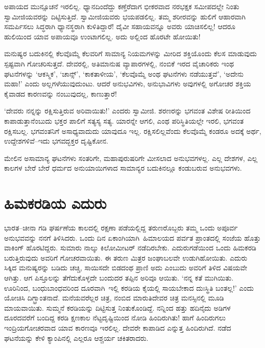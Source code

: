 ಅಪಾಯದ ಮುನ್ಸೂಚನೆ ಇರಲಿಲ್ಲ. ಧ್ಯಾನದಿಂದೆದ್ದು ಕಣ್ತೆರೆದಾಗ ಭೀಕರವಾದ ನರಭಕ್ಷಕ ಸಮೀಪದಲ್ಲೇ ನಿಂತು ಸ್ವಾಮೀಜಿಯವರನ್ನು ದಿಟ್ಟಿಸುತ್ತಿದೆ. ಸ್ವಾಮೀಜಿಯವರು ಭಯಪಡಲಿಲ್ಲ. ತಮ್ಮ ಶರೀರವನ್ನು ಹುಲಿಗೆ ಆಹಾರವಾಗಿ ಸಮರ್ಪಿಸಲು ಸಿದ್ಧರಾಗಿ ಧ್ಯಾನಸ್ಥರಾಗಿ ಕುಳಿತಿದ್ದಾರೆ! ದೈವೀ ಸಹಾಯವನ್ನೂ ಅವರು ಯಾಚಿಸಲಿಲ್ಲ! ಆದರೂ ಹುಲಿಯಿಂದ ಯಾವ ಅಪಾಯವೂ ಉಂಟಾಗಲಿಲ್ಲ. ಅದು ಅಲ್ಲಿಂದ ಹೊರಟೇ ಹೋಯಿತು!

ಮನುಷ್ಯರ ಬದುಕಿನಲ್ಲಿ ಕೆಲವೊಮ್ಮೆ ಕೆಲವರಿಗೆ ಸಾಮಾನ್ಯ ನಿಯಮಗಳನ್ನು ಮೀರಿದ ಶಕ್ತಿ\-ಯೊಂದು ಕೆಲಸ ಮಾಡುವುದು ಸ್ಪಷ್ಟವಾಗಿ ಗೋಚರಿಸುತ್ತದೆ. ದೇವರಲ್ಲಿ, ಅತಿಮಾನುಷ ವ್ಯಾಪಾರಗಳಲ್ಲಿ, ನಂಬಿಕೆ ಇರದ ವೈಚಾರಿಕರು ಇಂಥ ಘಟನೆಗಳನ್ನು ‘ಆಕಸ್ಮಿಕ’, ‘ಚಾನ್ಸ್​’, ‘ಕಾಕತಾಳೀಯ’, ‘ಕೆಲವೊಮ್ಮೆ ಅಂಥ ಘಟನೆಗಳು ನಡೆಯುತ್ತವೆ’, ‘ಅದೇನು ಮಹಾ!’ ಎಂದು ಅಲ್ಲಗಳೆಯುವುದುಂಟು. ಆದರೆ ಅನುಭವಿಗಳು, ಅನುಭಾವಿಗಳು ಅವುಗಳಲ್ಲಿ ಅಗೋಚರ ಶಕ್ತಿಯ ಕೈವಾಡದ ಕಾರಣವನ್ನು ನಂಬುವುದಲ್ಲ, ಕಾಣುತ್ತಾರೆ!

‘ದೇವರು ನನ್ನನ್ನು ರಕ್ಷಿಸುತ್ತಿರುವ ಅರಿವಾಯಿತು!’ ಎಂದರು ಸ್ವಾಮೀಜಿ. ಶರಣರನ್ನು ಭಗವಂತ ವಿಶೇಷ ರೀತಿಯಿಂದ ಕಾಪಾಡುತ್ತಾನೆಂಬುದು ಭಕ್ತರ ಪಾಲಿಗೆ ಸತ್ಯಸ್ಯ ಸತ್ಯ. ಯಾರನ್ನೇ ಆಗಲಿ, ಎಂಥ ಪರಿಸ್ಥಿತಿಯಲ್ಲೇ ಇರಲಿ, ಭಗವಂತ ರಕ್ಷಿಸಬಲ್ಲ. ಭಗವಂತನಿಗೆ ಅಸಾಧ್ಯವಾದುದು ಯಾವುದೂ ಇಲ್ಲ. ರಕ್ಷಿಸಲಿಲ್ಲವೆಂದು ಕೆಲವೊಮ್ಮೆ ಕಂಡರೂ ಅದಕ್ಕೆ ಅರ್ಥ, ಉದ್ದೇಶಗಳಿವೆ–ಇದು ಭಗವದ್ಭಕ್ತರ ದೃಷ್ಟಿಕೋನ.

ಮೇಲಿನ ಅಸಾಮಾನ್ಯ ಘಟನೆಗಳು ಸಂತರಿಗೇ, ಮಹಾಪುರುಷರಿಗೇ ಮೀಸಲಾದ ಅನುಭವಗಳಲ್ಲ. ಎಲ್ಲ ದೇಶಗಳ, ಎಲ್ಲ ಕಾಲಗಳ ಬೇರೆ ಬೇರೆ ಧರ್ಮದ ಅನುಯಾಯಿಗಳಾದ ಸಾಮಾನ್ಯರ ಬದುಕಿನಲ್ಲೂ ಕಂಡುಬರುವ ಅನುಭವಗಳು.


\section*{ಹಿಮಕರಡಿಯ ಎದುರು}


ಭಾರತ–ಚೀನಾ ಗಡಿ ಘರ್ಷಣೆಯ ಕಾಲದಲ್ಲಿ ರಕ್ಷಣಾ ಪಡೆಯಲ್ಲಿದ್ದ ತರುಣರೊಬ್ಬರು ತಮ್ಮ ಒಂದು ಅಪೂರ್ವ ಅನುಭವವನ್ನು ನನಗೆ ತಿಳಿಸಿದರು. ಒಂದು ದಿನ ಏಕಾಂಗಿಯಾಗಿ\hbox{ ಹಿಮಾಲಯದ} ಪರ್ವತ ಪ್ರಾಂತದಲ್ಲಿ ಸಂಜೆಯ ಹೊತ್ತು ವಾಕಿಂಗ್ ಹೊರಟಿದ್ದರು. ಸುಮಾರು ನಾಲ್ಕು ಕಿಲೋ\-ಮೀಟರ್ ನಡೆದಿರಬೇಕು. ಎದುರುಗಡೆಯಿಂದ ಒಂದು ಹಿಮಕರಡಿ ಬರುತ್ತಿರುವುದು ಅವರಿಗೆ ಗೋಚರವಾಯಿತು. ಈ ತರುಣ ಮಿತ್ರರ ಜಂಘಾಬಲವೇ ಉಡುಗಿಹೋಯಿತು. ಎದುರು ಸಿಕ್ಕಿದ ಮನುಷ್ಯರನ್ನು ಬಡಿದು ಚಚ್ಚಿ, ಸಾಯಿಸದೇ ಬಿಡದಂಥ ಪ್ರಾಣಿ ಅದು ಎಂಬುದು ಅವರಿಗೆ ತಿಳಿದ ವಿಷಯವೇ ಆಗಿತ್ತು. ಆಗ ಪಿಸ್ತೂಲನ್ನು ತೆಗೆದುಕೊಳ್ಳದೇ ಬಂದುದರ ತಪ್ಪಿನ ಅರಿವೂ ಆಯಿತು. ‘ನನ್ನ ಕತೆ ಮುಗಿಯಿತು. ಊರಿನಿಂದ, ಬಂಧುಬಾಂಧವರಿಂದ \hbox{ದೂರವಾಗಿ}~ಇಲ್ಲಿ ಕರಡಿಯ ಕೈಯಲ್ಲಿ ಸಾಯಬೇಕಾದ ದುಃಸ್ಥಿತಿ ಬಂತಲ್ಲ!’ ಎಂದು ಯೋಚಿಸಿ ದಿಗ್ಭ್ರಾಂತ\-ನಾದೆ. ಮನೆಯವರೆಲ್ಲರ ಚಿತ್ರ, ನಂಬಿದ ಮಾರುತಿದೇವರ ಚಿತ್ರ ಮನಸ್ಸಿನಲ್ಲಿ ಮೂಡಿ ಮಾಯ\-ವಾಯಿತು. ಸುಮ್ಮನೆ ಕರಡಿಯನ್ನು ದಿಟ್ಟಿಸುತ್ತ ನಿಂತುಕೊಂಡಿದ್ದೆ. ನನ್ನಿಂದ ಹತ್ತು ಹದಿನೈದು ಅಡಿಗಳ ದೂರದವರೆಗೆ ಬಂದಿದ್ದ ಕರಡಿ ಕ್ಷಣಕಾಲ ನೆಟ್ಟದೃಷ್ಟಿಯಿಂದ ನೋಡಿ ಹಿಂದಿರುಗಿತು! ಹಾಗೆ ಹಿಂದಿರುಗಲು ಇಂದ್ರಿಯಗೋಚರವಾದ ಯಾವ ಕಾರಣವೂ ಇರಲಿಲ್ಲ. ದೇವರೇ ಕಾಪಾಡಿದ ಎನ್ನುತ್ತ ಹಿಂದಿರು\-ಗಿದೆ. ನಡೆದ ಘಟನೆಯನ್ನು ಕೇಳಿ ಕ್ಯಾಂಪಿನಲ್ಲಿ ಎಲ್ಲರೂ ಆಶ್ಚರ್ಯ \hbox{ಚಕಿತರಾದರು.}

